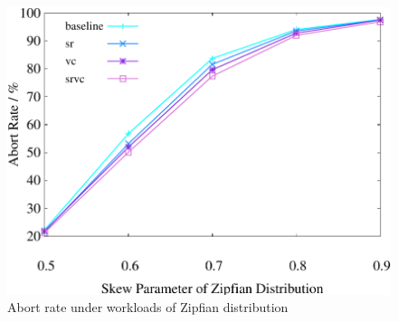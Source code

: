 \begin{figure}[t]
\begin{minipage}[b]{0.32\linewidth}
            \label{fig:basic:tps}
        \end{minipage}    
    \begin{minipage}[b]{0.32\linewidth}
        \centering
        \includegraphics[width=\textwidth]{./exp_fig/basic/abort}
        \vspace{-2em}
        \caption{Abort rate under workloads of Zipfian distribution}
        \label{fig:basic:abort}
    \end{minipage}
    \vspace{-1em}
\end{figure}


